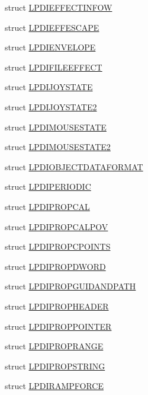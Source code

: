 \begin{DoxyCompactItemize}
struct \hyperlink{a00003_df/d13/a00085}{L\-P\-D\-I\-E\-F\-F\-E\-C\-T\-I\-N\-F\-O\-W}
\item 
struct \hyperlink{a00003_da/d2a/a00086}{L\-P\-D\-I\-E\-F\-F\-E\-S\-C\-A\-P\-E}
\item 
struct \hyperlink{a00003_d1/d1e/a00087}{L\-P\-D\-I\-E\-N\-V\-E\-L\-O\-P\-E}
\item 
struct \hyperlink{a00003_db/ddf/a00088}{L\-P\-D\-I\-F\-I\-L\-E\-E\-F\-F\-E\-C\-T}
\item 
struct \hyperlink{a00003_db/dab/a00089}{L\-P\-D\-I\-J\-O\-Y\-S\-T\-A\-T\-E}
\item 
struct \hyperlink{a00003_d9/dec/a00090}{L\-P\-D\-I\-J\-O\-Y\-S\-T\-A\-T\-E2}
\item 
struct \hyperlink{a00003_da/d82/a00091}{L\-P\-D\-I\-M\-O\-U\-S\-E\-S\-T\-A\-T\-E}
\item 
struct \hyperlink{a00003_d1/dc1/a00092}{L\-P\-D\-I\-M\-O\-U\-S\-E\-S\-T\-A\-T\-E2}
\item 
struct \hyperlink{a00003_d4/d7d/a00093}{L\-P\-D\-I\-O\-B\-J\-E\-C\-T\-D\-A\-T\-A\-F\-O\-R\-M\-A\-T}
\item 
struct \hyperlink{a00003_dc/d54/a00094}{L\-P\-D\-I\-P\-E\-R\-I\-O\-D\-I\-C}
\item 
struct \hyperlink{a00003_d9/d77/a00095}{L\-P\-D\-I\-P\-R\-O\-P\-C\-A\-L}
\item 
struct \hyperlink{a00003_d9/df8/a00096}{L\-P\-D\-I\-P\-R\-O\-P\-C\-A\-L\-P\-O\-V}
\item 
struct \hyperlink{a00003_d1/d84/a00097}{L\-P\-D\-I\-P\-R\-O\-P\-C\-P\-O\-I\-N\-T\-S}
\item 
struct \hyperlink{a00003_d1/d44/a00098}{L\-P\-D\-I\-P\-R\-O\-P\-D\-W\-O\-R\-D}
\item 
struct \hyperlink{a00003_da/d74/a00099}{L\-P\-D\-I\-P\-R\-O\-P\-G\-U\-I\-D\-A\-N\-D\-P\-A\-T\-H}
\item 
struct \hyperlink{a00003_d0/d61/a00100}{L\-P\-D\-I\-P\-R\-O\-P\-H\-E\-A\-D\-E\-R}
\item 
struct \hyperlink{a00003_d4/d3a/a00101}{L\-P\-D\-I\-P\-R\-O\-P\-P\-O\-I\-N\-T\-E\-R}
\item 
struct \hyperlink{a00003_d9/dcc/a00102}{L\-P\-D\-I\-P\-R\-O\-P\-R\-A\-N\-G\-E}
\item 
struct \hyperlink{a00003_d5/d1e/a00103}{L\-P\-D\-I\-P\-R\-O\-P\-S\-T\-R\-I\-N\-G}
\item 
struct \hyperlink{a00003_d0/dc2/a00104}{L\-P\-D\-I\-R\-A\-M\-P\-F\-O\-R\-C\-E}
\end{DoxyCompactItemize}


